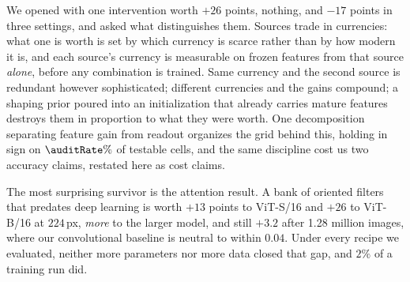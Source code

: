 We opened with one intervention worth $+26$ points, nothing, and $-17$ points
in three settings, and asked what distinguishes them. Sources trade in
currencies: what one is worth is set by which currency is scarce rather than
by how modern it is, and each source's currency is measurable on frozen
features from that source \emph{alone}, before any combination is trained.
Same currency and the second source is redundant however sophisticated;
different currencies and the gains compound; a shaping prior poured into an
initialization that already carries mature features destroys them in
proportion to what they were worth. One decomposition separating feature gain
from readout organizes the grid behind this, holding in sign on
$\auditRate\%$ of testable cells, and the same discipline cost us two accuracy
claims, restated here as cost claims.

The most surprising survivor is the attention result. A bank of oriented
filters that predates deep learning is worth $+13$ points to ViT-S/16 and
$+26$ to ViT-B/16 at $224$\,px, \emph{more} to the larger model, and still
$+3.2$ after 1.28 million images, where our convolutional baseline is neutral
to within $0.04$. Under every recipe we evaluated, neither more parameters nor more data closed
that gap, and $2\%$ of a training run did.
